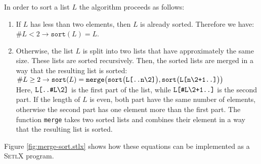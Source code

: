 In order to sort a list $L$ the algorithm proceeds as follows:
\begin{enumerate}
\item If $L$ has less than two elements, then $L$ is already sorted.  Therefore we have: 
      \\[0.2cm]
      \hspace*{1.3cm}
      $\#L < 2 \rightarrow \mathtt{sort}(L) = L$.
\item Otherwise, the list $L$ is split into two lists that have approximately the same size.
      These lists are sorted recursively.  Then, the sorted lists are merged in a way that the
      resulting list is sorted: \\[0.2cm]
      \hspace*{1.3cm} 
      $\#L \geq 2 \rightarrow \mathtt{sort}(L) =
         \mathtt{merge}\bigl(\mathtt{sort}\bigl(\texttt{L[..n\symbol{92}2]}\bigr),
         \mathtt{sort}\bigl(\texttt{L[n\symbol{92}2+1..]}\bigr)\bigr)
     $
     \\[0.2cm]
     Here, $\texttt{L[..\#L\symbol{92}2]}$ is the first part of the list, while
     $\texttt{L[\#L\symbol{92}2+1..]}$ is the second part.  If the length of $L$ is even, both part have the same number of
     elements, otherwise the second part has one element more than the first part.  The function \texttt{merge}
     takes two sorted lists and combines their element in a way that the resulting list is sorted.
\end{enumerate}
Figure \ref{fig:merge-sort.stlx} shows how these equations can be implemented as a \textsc{SetlX}
program.  

